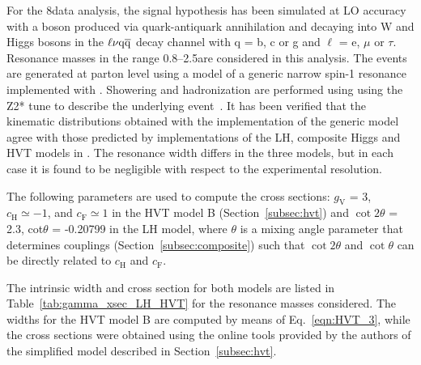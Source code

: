 For the 8\TeV data analysis, the signal hypothesis has been simulated at LO accuracy with a \Wpr boson produced via quark-antiquark annihilation and decaying into W and Higgs bosons
in the $\ell\nu\mathrm{q}\overline{\mathrm{q}}$ decay channel with q = b, c or g and $\ell$ = e, $\mu$ or $\tau$. Resonance masses in the range 0.8--2.5\TeV are considered in this analysis.
The events are generated at parton level using a model of a generic narrow spin-1 \Wpr resonance implemented with \MADGRAPH{}.
Showering and hadronization are performed using  using the Z2* tune to describe the underlying event~\cite{Chatrchyan:2011id,Chatrchyan:2013gfi}.
It has been verified that the kinematic distributions obtained with the implementation of the generic model 
agree with those predicted by implementations of the LH, composite Higgs and HVT models in \MADGRAPH{}.
The resonance width differs in the three models, but in each case it is found to be negligible with respect to the experimental resolution.

The following parameters are used to compute the cross sections: $g_\mathrm{V}$ = 3, $c_\mathrm{H} \simeq -1$, and $c_\mathrm{F} \simeq 1$
in the HVT model B (Section~\ref{subsec:hvt}) and $\cot 2 \theta$ = 2.3, cot$\theta$ = -0.20799 in the LH model, where $\theta$ is a mixing
angle parameter that determines \Wpr couplings (Section~\ref{subsec:composite}) such that $\cot 2 \theta$ and $\cot\theta$ can be directly related to $c_\mathrm{H}$ and $c_\mathrm{F}$.

The intrinsic width and cross section for both models are listed in Table~\ref{tab:gamma_xsec_LH_HVT} for the resonance masses considered.
The widths for the HVT model B are computed by means of Eq.~\ref{eqn:HVT_3},
while the cross sections were obtained using the online tools provided by the authors of the simplified model described in Section~\ref{subsec:hvt}.

